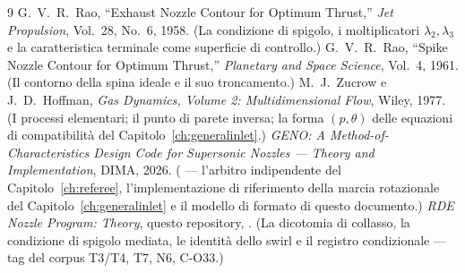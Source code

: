 \tableofcontents



















\appendix


\begin{thebibliography}{9}
 G.~V.~R.~Rao, ``Exhaust Nozzle Contour for Optimum
Thrust,'' \emph{Jet Propulsion}, Vol.~28, No.~6, 1958. (La condizione
di spigolo, i moltiplicatori $\lambda_2,\lambda_3$ e la
caratteristica terminale come superficie di controllo.)
 G.~V.~R.~Rao, ``Spike Nozzle Contour for Optimum
Thrust,'' \emph{Planetary and Space Science}, Vol.~4, 1961. (Il
contorno della spina ideale e il suo troncamento.)
 M.~J.~Zucrow e J.~D.~Hoffman, \emph{Gas Dynamics,
Volume 2: Multidimensional Flow}, Wiley, 1977. (I processi
elementari; il punto di parete inversa; la forma $(p,\theta)$ delle
equazioni di compatibilità del Capitolo~\ref{ch:generalinlet}.)
 \emph{GENO: A Method-of-Characteristics Design Code for
Supersonic Nozzles --- Theory and Implementation}, DIMA, 2026.
( --- l'arbitro
indipendente del Capitolo~\ref{ch:referee}, l'implementazione di
riferimento della marcia rotazionale del
Capitolo~\ref{ch:generalinlet} e il modello di formato di questo
documento.)
 \emph{RDE Nozzle Program: Theory}, questo
repository, . (La
dicotomia di collasso, la condizione di spigolo mediata, le identità
dello swirl e il registro condizionale --- tag del corpus T3/T4, T7,
N6, C-O33.)
\end{thebibliography}


